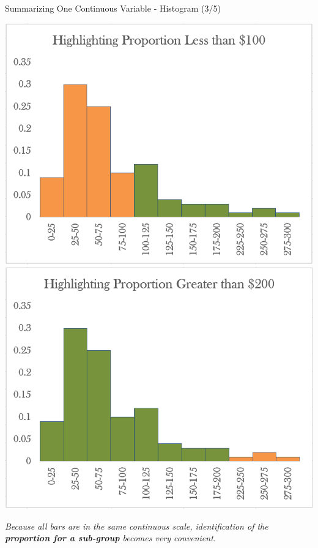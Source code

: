 \documentclass{beamer}
\begin{document}
\begin{frame}{Summarizing One Continuous Variable - Histogram (3/5)}

\begin{center}

\includegraphics[scale=0.27]{images/ch2Histogram3.png}
\includegraphics[scale=0.27]{images/ch2Histogram4.png}
\end{center}

\begin{center}
\textit{Because all bars are in the same continuous scale, identification of the \textbf{proportion for a sub-group} becomes very convenient. 
}
\end{center}

\end{frame}
\end{document}
